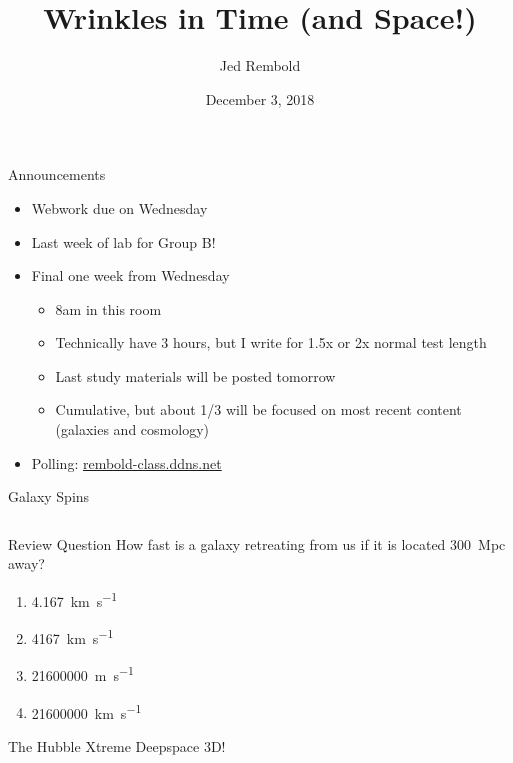 \documentclass[pdf,aspectratio=169]{beamer}
\title{Wrinkles in Time (and Space!)}
\date{December 3, 2018}
\author{Jed Rembold}
\begin{document}
\renewcommand*{\theenumi}{\Alph{enumi}}

\begin{frame}{Announcements}
  \begin{itemize}
	\item Webwork due on Wednesday
	\item Last week of lab for Group B!
	\item Final one week from Wednesday
	  \begin{itemize}
		\item 8am in this room
		\item Technically have 3 hours, but I write for 1.5x or 2x normal test length
		\item Last study materials will be posted tomorrow
		\item Cumulative, but about 1/3 will be focused on most recent content (galaxies and cosmology)
	  \end{itemize}
	\item Polling: \url{rembold-class.ddns.net}
  \end{itemize}
\end{frame}

\begin{frame}{Galaxy Spins}
	\begin{columns}
		
	\end{columns}
\end{frame}

\begin{frame}{Review Question}
  How fast is a galaxy retreating from us if it is located \SI{300}{\mega pc} away? 
  \begin{enumerate}
	\item \SI{4.167}{\kilo\meter\per\second}
	\item \SI{4167}{\kilo\meter\per\second}
	\item \alert<2>{\SI{21600000}{\meter\per\second}}
	\item \SI{21600000}{\kilo\meter\per\second}
  \end{enumerate}
\end{frame}

\begin{frame}{The Hubble Xtreme Deepspace 3D!}
  \begin{center}
  \end{center}
\end{frame}
\end{document}
